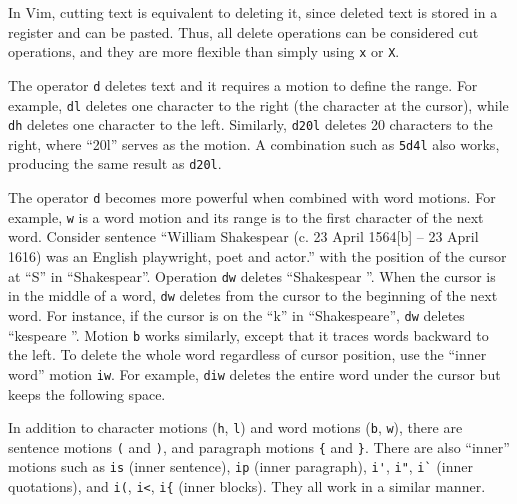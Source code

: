 In Vim, cutting text is equivalent to deleting it, since deleted text is stored in a register and can be pasted. Thus, all delete operations can be considered cut operations, and they are more flexible than simply using \verb|x| or \verb|X|.

The operator \verb|d| deletes text and it requires a motion to define the range. For example, \verb|dl| deletes one character to the right (the character at the cursor), while \verb|dh| deletes one character to the left. Similarly, \verb|d20l| deletes 20 characters to the right, where ``20l'' serves as the motion. A combination such as \verb|5d4l| also works, producing the same result as \verb|d20l|.

The operator \verb|d| becomes more powerful when combined with word motions. For example, \verb|w| is a word motion and its range is to the first character of the next word. Consider sentence ``William Shakespear (c. 23 April 1564[b] – 23 April 1616) was an English playwright, poet and actor.'' with the position of the cursor at ``S'' in ``Shakespear''. Operation \verb|dw| deletes ``Shakespear ''. When the cursor is in the middle of a word, \verb|dw| deletes from the cursor to the beginning of the next word. For instance, if the cursor is on the ``k'' in ``Shakespeare'', \verb|dw| deletes ``kespeare ''. Motion \verb|b| works similarly, except that it traces words backward to the left. To delete the whole word regardless of cursor position, use the ``inner word'' motion \verb|iw|. For example, \verb|diw| deletes the entire word under the cursor but keeps the following space.

In addition to character motions (\verb|h|, \verb|l|) and word motions (\verb|b|, \verb|w|), there are sentence motions \verb|(| and \verb|)|, and paragraph motions \verb|{| and \verb|}|. There are also ``inner'' motions such as \verb|is| (inner sentence), \verb|ip| (inner paragraph), \verb|i'|, \verb|i"|, \verb|i`| (inner quotations), and \verb|i(|, \verb|i<|, \verb|i{| (inner blocks). They all work in a similar manner.

